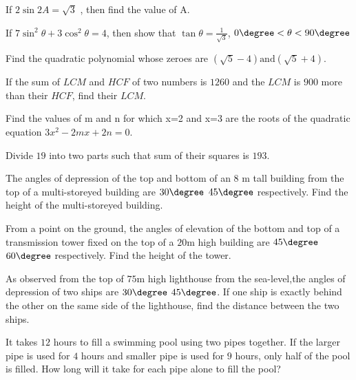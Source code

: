 \item If $2\sin 2A=\sqrt{3}$ , then find the value of A.

\item If $7\sin^2\theta + 3\cos^2\theta = 4$, then show that $\tan\theta= \frac{1}{\sqrt{3}}$, $0\degree <\theta < 90\degree$

\item Find the quadratic polynomial whose zeroes are $(\sqrt{5}-4) \text{and}(\sqrt{5}+4)$.

\item If the sum of $LCM$ and $HCF$ of two numbers is $1260$ and the $LCM$ is $900$ more than their $HCF$, find their $LCM$.

\item Find the values of m and n for which x=2 and x=3 are the roots of the quadratic equation $3x^2-2mx+2n=0$.

 \item Divide $19$ into two parts such that sum of their squares is $193$.

\item The angles of depression of the top and bottom of an $8$ m tall building from the top of a multi-storeyed building are $30\degree$  $45\degree$ respectively. Find the height of the multi-storeyed building.

\item From a point on the ground, the angles of elevation of the bottom and top of a transmission tower fixed on the top of a $20$m high building are $45\degree$  $60\degree$ respectively. Find the height of the tower.

 \item As observed from the top of $75$m high lighthouse from the sea-level,the angles of depression of two ships are $30\degree$   $45\degree$. If one ship is exactly behind the other on the same side of the lighthouse, find the distance between the two ships.

\item It takes $12$ hours to fill a swimming pool using two pipes together. If the larger pipe is used for $4$ hours and smaller pipe is used for $9$ hours, only half of the pool is filled. How long will it take for each pipe alone to fill the  pool? 

